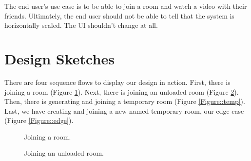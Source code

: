 The end user's use case is to be able to join a room and watch a video with their friends. Ultimately, the end user should not be
able to tell that the system is horizontally scaled. The UI shouldn't change at all.

\section{Design Sketches}

There are four sequence flows to display our design in action. First, there is joining a room (Figure \ref{Figure::room}). Next, there is joining an unloaded room (Figure \ref{Figure::unloaded}). Then, there is generating and joining a temporary room (Figure \ref{Figure::temp}). Last, we have creating and joining a new named temporary room, our edge case (Figure \ref{Figure::edge}).

\begin{figure}
  \centering
{}
  \caption{\label{Figure::room} Joining a room.}
\end{figure}

\begin{figure}
  \centering
{}
  \caption{\label{Figure::unloaded} Joining an unloaded room.}
\end{figure}

